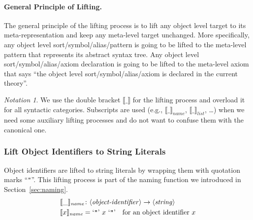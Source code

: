 \documentclass[UTF8,11pt]{article}
\newcounter{thmcounter}
\theoremstyle{plain}
\theoremstyle{definition}
\theoremstyle{remark}
\newtheorem{notation}   [thmcounter]{Notation}
\newcommand{\denote}[1]{\llbracket{#1}\rrbracket}
\newcommand{\quottt}[1]{\textrm{\lq\texttt{#1}\rq}}
\newcommand{\name}{\mathit{name}}
\newcommand{\llist}{\mathit{list}}
\newcommand{\syntacc}[1]{\text{$\langle$\textit{#1}$\rangle$}}
\begin{document}
\paragraph{General Principle of Lifting.}
The general principle of the lifting process is to lift any object level target 
to its meta-representation and keep any meta-level target unchanged.
More specifically,
any object level sort/symbol/alias/pattern is going to be lifted to the 
meta-level 
pattern that represents its abstract syntax tree. 
Any object level sort/symbol/alias/axiom declaration is going to be lifted to 
the meta-level axiom that says ``the object level sort/symbol/alias/axiom is 
declared in the current theory''.


\begin{notation}
	We use the double bracket $\denote{\_}$ for the lifting process and 
	overload it for all syntactic categories.
	Subscripts are used (e.g., $\denote{\_}_\name$, $\denote{\_}_\llist$, 
	\dots) when we need 
	some auxiliary lifting processes and do not want to confuse them 
	with the canonical one.
\end{notation}

\subsubsection{Lift Object Identifiers to String Literals}
Object identifiers are lifted to string literals by wrapping them with 
quotation marks ``\verb|"|''.
This lifting process is part of the naming function we introduced in 
Section~\ref{sec:naming}.
\begin{align*}
&\denote{\_}_\name \colon \syntacc{object-identifier} \to 
\syntacc{string} \\
&\denote{x}_\name = \quottt{"} \ x \  \quottt{"} \quad \text{for an object 
identifier $x$}
\end{align*}
\end{document}
